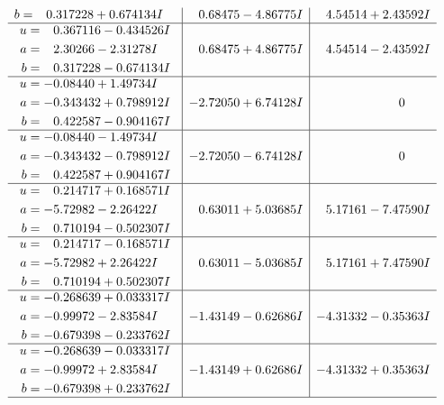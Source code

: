 \documentclass[1p]{elsarticle_modified}
\theoremstyle{definition}
\begin{document}
$$\begin{array}{c|c|c}
\begin{aligned}
b &= \phantom{-}0.317228 + 0.674134 I\end{aligned}
 & \phantom{-}0.68475 - 4.86775 I & \phantom{-}4.54514 + 2.43592 I \\ \hline\begin{aligned}
u &= \phantom{-}0.367116 - 0.434526 I \\
a &= \phantom{-}2.30266 - 2.31278 I \\
b &= \phantom{-}0.317228 - 0.674134 I\end{aligned}
 & \phantom{-}0.68475 + 4.86775 I & \phantom{-}4.54514 - 2.43592 I \\ \hline\begin{aligned}
u &= -0.08440 + 1.49734 I \\
a &= -0.343432 + 0.798912 I \\
b &= \phantom{-}0.422587 - 0.904167 I\end{aligned}
 & -2.72050 + 6.74128 I & \phantom{-0.000000 } 0 \\ \hline\begin{aligned}
u &= -0.08440 - 1.49734 I \\
a &= -0.343432 - 0.798912 I \\
b &= \phantom{-}0.422587 + 0.904167 I\end{aligned}
 & -2.72050 - 6.74128 I & \phantom{-0.000000 } 0 \\ \hline\begin{aligned}
u &= \phantom{-}0.214717 + 0.168571 I \\
a &= -5.72982 - 2.26422 I \\
b &= \phantom{-}0.710194 - 0.502307 I\end{aligned}
 & \phantom{-}0.63011 + 5.03685 I & \phantom{-}5.17161 - 7.47590 I \\ \hline\begin{aligned}
u &= \phantom{-}0.214717 - 0.168571 I \\
a &= -5.72982 + 2.26422 I \\
b &= \phantom{-}0.710194 + 0.502307 I\end{aligned}
 & \phantom{-}0.63011 - 5.03685 I & \phantom{-}5.17161 + 7.47590 I \\ \hline\begin{aligned}
u &= -0.268639 + 0.033317 I \\
a &= -0.99972 - 2.83584 I \\
b &= -0.679398 - 0.233762 I\end{aligned}
 & -1.43149 - 0.62686 I & -4.31332 - 0.35363 I \\ \hline\begin{aligned}
u &= -0.268639 - 0.033317 I \\
a &= -0.99972 + 2.83584 I \\
b &= -0.679398 + 0.233762 I\end{aligned}
 & -1.43149 + 0.62686 I & -4.31332 + 0.35363 I\\
 \hline 
 \end{array}$$\newpage\newpage\renewcommand{\arraystretch}{1}
\end{document}
